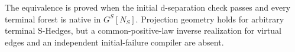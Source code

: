 The equivalence is proved when the initial d-separation check passes and every terminal forest is native in \(G^S[N_S]\). Projection geometry holds for arbitrary terminal S-Hedges, but a common-positive-law inverse realization for virtual edges and an independent initial-failure compiler are absent.